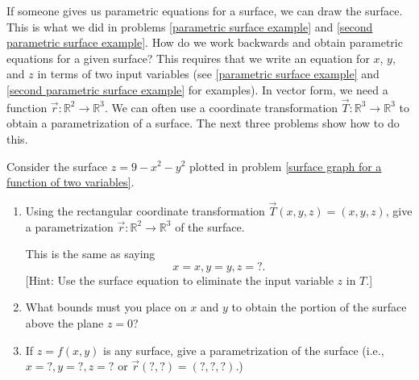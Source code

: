If someone gives us parametric equations for a surface, we can draw the surface. This is what we did in problems \ref{parametric surface example} and \ref{second parametric surface example}. 
How do we work backwards and obtain parametric equations for a given surface?
This requires that we write an equation for $x$, $y$, and $z$ in terms of two input variables (see \ref{parametric surface example} and \ref{second parametric surface example} for examples). 
In vector form, we need a function $\vec r\colon \mathbb{R}^2\to\mathbb{R}^3$. 
We can often use a coordinate transformation $\vec T\colon \mathbb{R}^3\to\mathbb{R}^3$ to obtain a parametrization of a surface. 
The next three problems show how to do this.   
\begin{problem}\label{3d parametric plot}
%
%
 Consider the surface $z=9-x^2-y^2$ plotted in problem \ref{surface graph for a function of two variables}.
\begin{enumerate}
 \item 
Using the rectangular coordinate transformation $\vec T(x,y,z)=(x,y,z)$, give a parametrization $\vec r\colon \mathbb{R}^2\to\mathbb{R}^3$ of the surface. 

This is the same as saying $$x=x, y=y, z=?.$$
[Hint: Use the surface equation to eliminate the input variable $z$ in $T$.]

 \item What bounds must you place on $x$ and $y$ to obtain the portion of the surface above the plane $z=0$?
 \item If $z=f(x,y)$ is any surface, give a parametrization of the surface (i.e., $x=?, y=?, z=?$ or $\vec r (?,?)=(?,?,?)$.)
\end{enumerate}

\end{problem}

